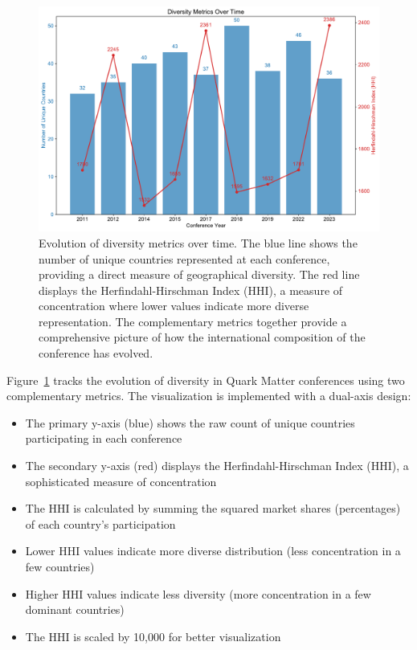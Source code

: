 \documentclass[a4paper,11pt]{article}
\begin{document}
\begin{figure}[H]
\centering
\includegraphics[width=\textwidth]{figures/diversity_metrics.pdf}
\caption{Evolution of diversity metrics over time. The blue line shows the number of unique countries represented at each conference, providing a direct measure of geographical diversity. The red line displays the Herfindahl-Hirschman Index (HHI), a measure of concentration where lower values indicate more diverse representation. The complementary metrics together provide a comprehensive picture of how the international composition of the conference has evolved.}
\label{fig:diversity_metrics}
\end{figure}

Figure~\ref{fig:diversity_metrics} tracks the evolution of diversity in Quark Matter conferences using two complementary metrics. The visualization is implemented with a dual-axis design:

\begin{itemize}
    \item The primary y-axis (blue) shows the raw count of unique countries participating in each conference
    \item The secondary y-axis (red) displays the Herfindahl-Hirschman Index (HHI), a sophisticated measure of concentration
    \item The HHI is calculated by summing the squared market shares (percentages) of each country's participation
    \item Lower HHI values indicate more diverse distribution (less concentration in a few countries)
    \item Higher HHI values indicate less diversity (more concentration in a few dominant countries)
    \item The HHI is scaled by 10,000 for better visualization
\end{itemize}
\end{document}
